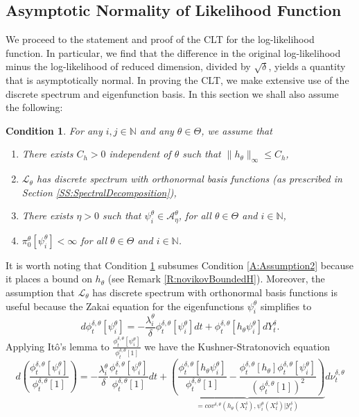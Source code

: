 \documentclass{article}
\newtheorem{condition}{Condition}[section]
\begin{document}
\subsection{Asymptotic Normality of Likelihood Function}\label{SS:PreparatoryCLT}
We  proceed to the statement and proof of the CLT for the log-likelihood function. In particular, we find that the difference in the original  log-likelihood
minus the log-likelihood of reduced dimension, divided by  $\sqrt{\delta}$, yields a quantity that is asymptotically normal. In proving the CLT, we  make extensive use of the discrete spectrum and eigenfunction basis. In this section we shall also assume the following:
\begin{condition}\label{A:Assumption3}
For any $i,j\in\mathbb{N}$ and any $\theta\in\Theta$, we assume that
\begin{enumerate}
\item{There exists $C_h>0$ independent of $\theta$ such that $\|h_{\theta}\|_\infty \leq C_h$,}
\item $\mathcal L_{\theta}$ has discrete spectrum with orthonormal basis functions (as prescribed in Section \ref{SS:SpectralDecomposition}),
\item{There exists $\eta>0$ such that $\psi_{i}^{\theta}\in\mathcal{A}_{\eta}^\theta$, for all $\theta\in\Theta$ and $i\in\mathbb{N}$,}
\item{$\pi^{\theta}_{0}[\psi_{i}^{\theta}]<\infty$ for all $\theta\in\Theta$ and $i\in\mathbb{N}$.}
\end{enumerate}
\end{condition}
It is worth noting that Condition \ref{A:Assumption3} subsumes Condition \ref{A:Assumption2} because it places a bound on $h_\theta$ (see Remark \ref{R:novikovBoundedH}). Moreover, the assumption that $\mathcal L_{\theta}$ has discrete spectrum with orthonormal basis functions is useful because the Zakai equation for the eigenfunctions $\psi_i^{\theta}$ simplifies to
\begin{equation}
\label{eq:spectralZakai}
d\phi_t^{\delta,\theta}[\psi_i^{\theta}] =-\frac{\lambda_i^{\theta}}{\delta} \phi_t^{\delta,\theta}[\psi_i^{\theta}]dt+\phi_t^{\delta,\theta}[h_{\theta} \psi_i^{\theta}]dY^{\delta}_t .
\end{equation}
Applying It\^o's lemma to $\frac{\phi_t^{\delta,\theta}[\psi_i^{\theta}]}{\phi_t^{\delta,\theta}[1]}$ we have the Kushner-Stratonovich equation
\begin{equation}
\label{eq:KS}
d\left(\frac{\phi_t^{\delta,\theta}[\psi_i^{\theta}]}{\phi_t^{\delta,\theta}[1]}\right)=-\frac{\lambda_i^{\theta}}{\delta}\frac{\phi_t^{\delta,\theta}[\psi_i^{\theta}]}{\phi_t^{\delta,\theta}[1]}dt+\underbrace{\left(\frac{\phi_t^{\delta,\theta}[h_{\theta}\psi_i^{\theta}]}{\phi_t^{\delta,\theta}[1]}-\frac{\phi_t^{\delta,\theta}[h_{\theta}]\phi_t^{\delta,\theta}[\psi_i^{\theta}]}{\left(\phi_t^{\delta,\theta}[1]\right)^2} \right) }_{=cov^{\delta,\theta}\left(h_{\theta}(X_t^\delta),\psi_i^{\theta}(X_t^\delta)|\mathcal{Y}^{\delta}_{t}\right)}d\nu_t^{\delta,\theta}
\end{equation}
\end{document}

